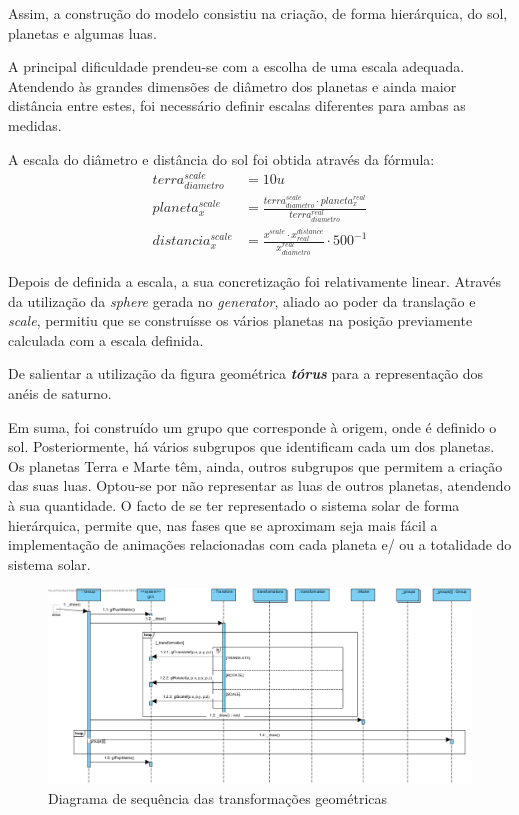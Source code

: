 \documentclass[runningheads]{llncs}
\begin{document}
Assim, a construção do modelo consistiu na criação, de 
forma hierárquica, do sol, planetas e algumas luas.

A principal dificuldade prendeu-se com a escolha de uma escala adequada.
Atendendo às grandes dimensões de diâmetro dos planetas e ainda maior distância entre estes,
foi necessário definir escalas diferentes para ambas as medidas.

A escala do diâmetro e distância do sol foi obtida através da fórmula:
\begin{align*}
    terra_{diametro}^{scale} & = 10 u \\
    planeta_{x}^{scale} &= \frac{terra_{diametro}^{scale} \cdot planeta_{x}^{real}}{terra_{diametro}^{real}} \\
    distancia_{x}^{scale} &= \frac{x^{scale}\cdot x^{distance}_{real}}{x_{diametro}^{real}} \cdot 500^{-1}
\end{align*}

Depois de definida a escala, a sua concretização foi relativamente linear.
Através da utilização da \textit{sphere} gerada no \textit{generator},
aliado ao poder da translação e \textit{scale}, permitiu que se construísse
os vários planetas na posição previamente calculada com a escala definida.

De salientar a utilização da figura geométrica \textbf{\textit{tórus}} para 
a representação dos anéis de saturno.

Em suma, foi construído um grupo que corresponde à origem, onde é definido o sol.
Posteriormente, há vários subgrupos que identificam cada um dos planetas.
Os planetas Terra e Marte têm, ainda, outros subgrupos que permitem a
criação das suas luas.
Optou-se por não representar as luas de outros planetas, atendendo à sua quantidade.
O facto de se ter representado o sistema solar de forma hierárquica, 
permite que, nas fases que se aproximam seja mais fácil a implementação 
de animações relacionadas com cada planeta e/ ou a totalidade do sistema solar. 

\begin{landscape}
    \begin{figure}
        \centering
        \includegraphics[width=\linewidth]{assets/geom_transf.jpg}
        \caption{Diagrama de sequência das transformações geométricas} \label{fig:seq_transf_geom}
    \end{figure}
\end{landscape}
\end{document}

